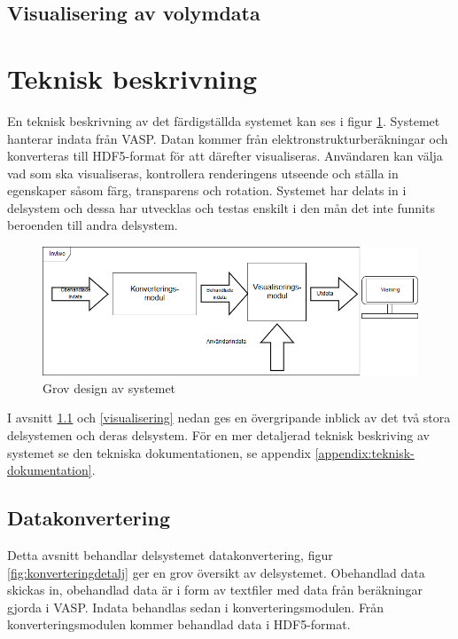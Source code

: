 \documentclass[a4paper,12pt]{article}
\begin{document}
\subsection{Visualisering av volymdata}

\section{Teknisk beskrivning}

En teknisk beskrivning av det  färdigställda systemet kan ses i figur \ref{fig:grov-skiss}. %
Systemet hanterar indata från VASP. %
Datan kommer från elektronstrukturberäkningar och konverteras till HDF5-format för att därefter visualiseras. Användaren kan välja vad som ska visualiseras, kontrollera renderingens utseende och ställa in egenskaper såsom färg, transparens och rotation.
Systemet har delats in i delsystem och dessa har utvecklas och testas enskilt i den mån det inte funnits beroenden till andra delsystem.

\begin{figure}[H]
	\centering
	\includegraphics[scale=0.55]{grov-skiss.png}
	\caption{Grov design av systemet}
	\label{fig:grov-skiss}
\end{figure}

I avsnitt \ref{datakonvertering} och \ref{visualisering} nedan ges en övergripande inblick av det två stora delsystemen och deras delsystem. För en mer detaljerad teknisk beskriving av systemet se den tekniska dokumentationen, se appendix \ref{appendix:teknisk-dokumentation}.

\subsection{Datakonvertering}
\label{datakonvertering}
Detta avsnitt behandlar delsystemet datakonvertering, figur \ref{fig:konverteringdetalj} ger en grov översikt av delsystemet. Obehandlad data skickas in, obehandlad data är i form av textfiler med data från beräkningar gjorda i VASP.%
Indata behandlas sedan i konverteringsmodulen. Från konverteringsmodulen kommer behandlad data i HDF5-format.
\end{document}
